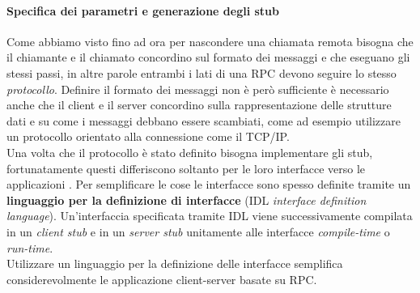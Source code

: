 \paragraph{Specifica dei parametri e generazione degli stub}
Come abbiamo visto fino ad ora per nascondere una chiamata remota bisogna che il chiamante e il chiamato concordino sul formato dei messaggi e che eseguano gli stessi passi, in altre parole entrambi i lati di una RPC devono seguire lo stesso \emph{protocollo}. Definire il formato dei messaggi non è però sufficiente è necessario anche che il client e il server concordino sulla rappresentazione delle strutture dati e su come i messaggi debbano essere scambiati, come ad esempio utilizzare un protocollo orientato alla connessione come il TCP/IP.\\
Una volta che il protocollo è stato definito bisogna implementare gli stub, fortunatamente questi differiscono soltanto per le loro interfacce verso le applicazioni .
Per semplificare le cose le interfacce sono spesso definite tramite un \textbf{linguaggio per la definizione di interfacce} (IDL \emph{interface definition language}). Un'interfaccia specificata tramite IDL viene successivamente compilata in un \emph{client stub} e in un \emph{server stub} unitamente alle interfacce \emph{compile-time} o \emph{run-time}.\\
Utilizzare un linguaggio per la definizione delle interfacce semplifica considerevolmente le applicazione client-server basate su RPC.
